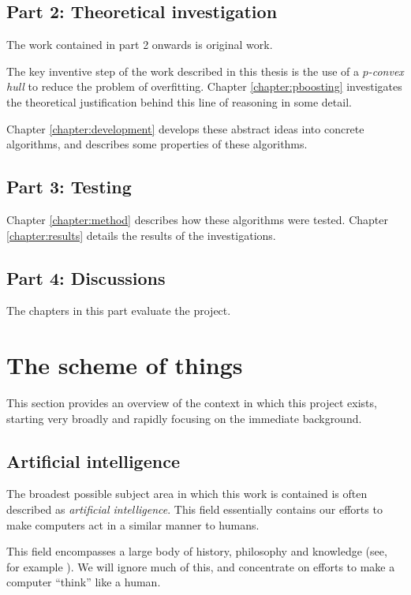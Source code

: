 \subsection*{Part 2: Theoretical investigation}

The work contained in part 2 onwards is original work.

The key inventive step of the work described in this thesis is the use of a
\emph{$p$-convex hull} to reduce the problem of overfitting.  Chapter
\ref{chapter:pboosting} investigates the theoretical justification
behind this line of reasoning in some detail.

Chapter \ref{chapter:development} develops these abstract ideas into
concrete algorithms, and describes some properties of these
algorithms.

\subsection*{Part 3: Testing}

Chapter \ref{chapter:method} describes how these algorithms were
tested.  Chapter \ref{chapter:results} details the results of the
investigations.

\subsection*{Part 4: Discussions}

The chapters in this part evaluate the project.

\section{The scheme of things}

This section provides an overview of the context in which this project
exists, starting very broadly and rapidly focusing on the immediate
background.

\subsection{Artificial intelligence}

The broadest possible subject area in which this work is contained is
often described as \emph{artificial intelligence}.  This field
essentially contains our efforts to make computers act in a similar
manner to humans.

This field encompasses a large body of history, philosophy and
knowledge (see, for example \cite{Penrose89}).  We will ignore much
of this, and concentrate on efforts to make a computer ``think'' like
a human.

